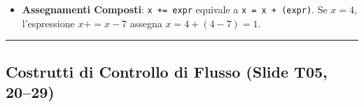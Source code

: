 \documentclass[11pt,a4paper,oneside]{report}
\newcommand{\passthrough}[1]{#1}
\providecommand{\tightlist}{\setlength{\itemsep}{0pt}\setlength{\parskip}{0pt}}
\begin{document}
\begin{itemize}
  \begin{itemize}
  \tightlist
  \item
    \passthrough{\lstinline!\&!}, \passthrough{\lstinline!|!}: valutano
    sempre entrambi i rami.
  \item
    \passthrough{\lstinline!\&\&!}, \passthrough{\lstinline!||!}:
    valutazione a corto circuito (\emph{short-circuit}). Se il primo
    operando determina già il risultato, il secondo non viene nemmeno
    eseguito (essenziale per prevenire crash su puntatori nulli).
  \end{itemize}
\item
  \textbf{Assegnamenti Composti}: \passthrough{\lstinline!x += expr!}
  equivale a \passthrough{\lstinline!x = x + (expr)!}. Se \(x=4\),
  l'espressione \(x += x - 7\) assegna \(x = 4 + (4 - 7) = 1\).
\end{itemize}

\begin{center}\rule{0.5\linewidth}{0.5pt}\end{center}

\subsection{Costrutti di Controllo di Flusso (Slide T05,
20--29)}\label{chap05_costrutti-di-controllo-di-flusso-slide-t05-2029}
\end{document}
